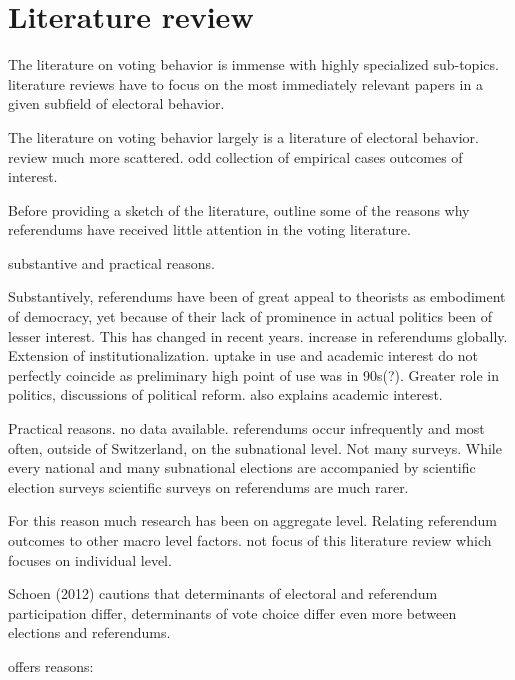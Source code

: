 \documentclass[11pt,a4paper]{article}
\begin{document}
\section{Literature review}\label{sec:litreview}

	The literature on voting behavior is immense with highly specialized sub-topics. literature reviews have to focus on the most immediately relevant papers in a given subfield of electoral behavior. 
	
	The literature on voting behavior largely is a literature of electoral behavior. review much more scattered. odd collection of empirical cases outcomes of interest.
	
	Before providing a sketch of the literature, outline some of the reasons why referendums have received little attention in the voting literature. 
	
	substantive and practical reasons.
	
	Substantively, referendums have been of great appeal to theorists as embodiment of democracy, yet because of their lack of prominence in actual politics been of lesser interest. This has changed in recent years. increase in referendums globally. Extension of institutionalization. uptake in use and academic interest do not perfectly coincide as preliminary high point of use was in 90s(?). Greater role in politics, discussions of political reform. also explains academic interest.
		
	Practical reasons. no data available. referendums occur infrequently and most often, outside of Switzerland, on the subnational level. Not many surveys. While every national and many subnational elections are accompanied by scientific election surveys scientific surveys on referendums are much rarer. 
	
	For this reason much research has been on aggregate level. Relating referendum outcomes to other macro level factors. not focus of this literature review which focuses on individual level.
	
	Schoen (2012) cautions that determinants of electoral and referendum participation differ, determinants of vote choice differ even more between elections and referendums. 
	
	offers reasons:
	
\end{document}
